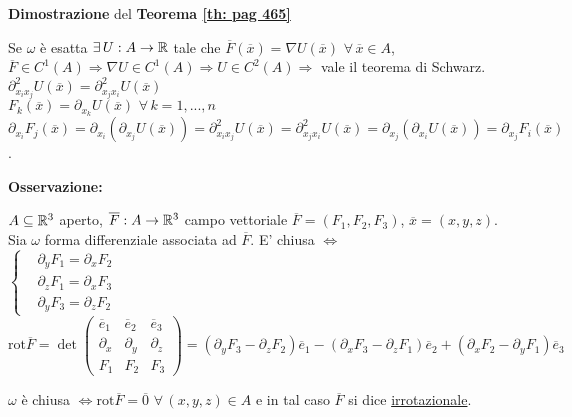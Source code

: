 	
\begin{dembar}
	\textbf{Dimostrazione} del \textbf{Teorema \ref{th: pag 465}}
	
	Se $\omega$ è esatta $\exists \, U : A\rightarrow \mathbb{R}$ tale che $\overline{F}(\overline{x})=\nabla U(\overline{x})\,\, \forall\, \overline{x}\in A$, $\overline{F}\in C^1(A)\Rightarrow \nabla U \in C^1(A) \Rightarrow U \in C^2(A)\Rightarrow $ vale il teorema di Schwarz. \\
	$\partial_{x_ix_j}^2U(\overline{x})=\partial_{x_jx_i}^2U(\overline{x})$\\
	$F_k(\overline{x})=\partial_{x_k}U(\overline{x})\,\, \forall \, k =1,...,n$\\
	$\partial_{x_i}F_j(\overline{x})=\partial_{x_i}(\partial_{x_j}U(\overline{x}))=\partial_{x_ix_j}^2U(\overline{x})=\partial_{x_jx_i}^2U(\overline{x})=\partial_{x_j}(\partial_x_iU(\overline{x}))=\partial_{x_j}F_i(\overline{x})$.
\end{dembar}
	

\textbf{Osservazione:}

$A \subseteq \mathbb{R}^3$ aperto, $\overline{F}: A \rightarrow \mathbb{R}^3$ campo vettoriale $\overline{F}= (F_1,F_2,F_3)$, $\overline{x}=(x,y,z)$. Sia $\omega$ forma differenziale associata ad $\overline{F}$. E' chiusa $\Leftrightarrow$\\
$\begin{cases}
	&\partial_yF_1=\partial_xF_2\\
	&\partial_zF_1=\partial_x F_3\\
	&\partial_yF_3= \partial_z F_2
\end{cases}$\\
$\text{rot}\overline{F}=\det \begin{pmatrix}
	\overline{e}_1 & \overline{e}_2 & \overline{e}_3\\
	\partial_x &\partial_y &\partial_z\\
	F_1 &F_2 &F_3
\end{pmatrix}= (\partial_yF_3-\partial_zF_2)\overline{e}_1-(\partial_xF_3-\partial_zF_1)\overline{e}_2+(\partial_xF_2-\partial_yF_1)\overline{e}_3$\\

\begin{attbar}
	$\omega $ è chiusa $\Leftrightarrow \text{rot}\overline{F}=\overline{0}\,\, \forall \, (x,y,z)\in A$ e in tal caso $\overline{F}$ si dice \underline{irrotazionale}.
\end{attbar}


